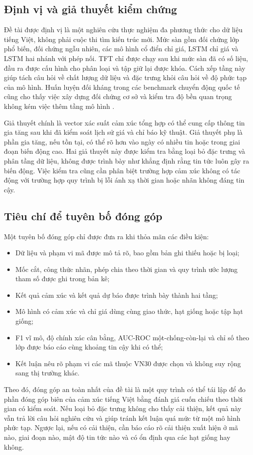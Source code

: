 \subsection{Định vị và giả thuyết kiểm chứng}

Đề tài được định vị là một nghiên cứu thực nghiệm đa phương thức cho dữ liệu tiếng
Việt, không phải cuộc thi tìm kiến trúc mới. Mức sàn gồm đối chứng lớp phổ biến, đối chứng ngẫu nhiên, các mô hình
cổ điển chỉ giá, LSTM chỉ giá và LSTM hai nhánh với phép nối. TFT chỉ được chạy sau khi
mức sàn đã có số liệu, đầu ra được cấu hình cho phân loại và tập giữ lại được khóa. Cách
xếp tầng này giúp tách câu hỏi về chất lượng dữ liệu và đặc trưng khỏi câu hỏi về độ
phức tạp của mô hình. Huấn luyện đối kháng trong các benchmark chuyển động quốc tế
cũng cho thấy việc xây dựng đối chứng cơ sở và kiểm tra độ bền quan trọng không kém việc
thêm tầng mô hình \cite{Feng2018_181009936v2}.

Giả thuyết chính là vector xác suất cảm xúc tổng hợp có thể cung cấp thông tin gia
tăng sau khi đã kiểm soát lịch sử giá và chỉ báo kỹ thuật. Giả thuyết phụ là phần gia
tăng, nếu tồn tại, có thể rõ hơn vào ngày có nhiều tin hoặc trong giai đoạn biến động
cao. Hai giả thuyết này được kiểm tra bằng loại bỏ đặc trưng và phân tầng dữ liệu, không được
trình bày như khẳng định rằng tin tức luôn gây ra biến động. Việc kiểm tra cũng cần
phân biệt trường hợp cảm xúc không có tác động với trường hợp quy trình bị lỗi ánh
xạ thời gian hoặc nhãn không đáng tin cậy.

\subsection{Tiêu chí để tuyên bố đóng góp}

Một tuyên bố đóng góp chỉ được đưa ra khi thỏa mãn các điều kiện:

\begin{itemize}[nosep]
  \item Dữ liệu và phạm vi mã được mô tả rõ, bao gồm bản ghi thiếu hoặc bị loại;
  \item Mốc cắt, công thức nhãn, phép chia theo thời gian và quy trình ước lượng tham số được
    ghi trong bản kê;
  \item Kết quả cảm xúc và kết quả dự báo được trình bày thành hai tầng;
  \item Mô hình có cảm xúc và chỉ giá dùng cùng giao thức, hạt giống hoặc tập hạt giống;
  \item F1 vĩ mô, độ chính xác cân bằng, AUC-ROC một-chống-còn-lại và chỉ số theo lớp được báo cáo
    cùng khoảng tin cậy khi có thể;
  \item Kết luận nêu rõ phạm vi các mã thuộc VN30 được chọn và không suy rộng sang thị
    trường khác.
\end{itemize}

Theo đó, đóng góp an toàn nhất của đề tài là một quy trình có thể tái lập để đo phần
đóng góp biên của cảm xúc tiếng Việt bằng đánh giá cuốn chiếu theo thời gian có kiểm soát. Nếu
loại bỏ đặc trưng không cho thấy cải thiện, kết quả này vẫn trả lời câu hỏi nghiên cứu và giúp
tránh kết luận quá mức từ một mô hình phức tạp. Ngược lại, nếu có cải thiện, cần báo
cáo rõ cải thiện xuất hiện ở mã nào, giai đoạn nào, mật độ tin tức nào và có ổn định
qua các hạt giống hay không.
